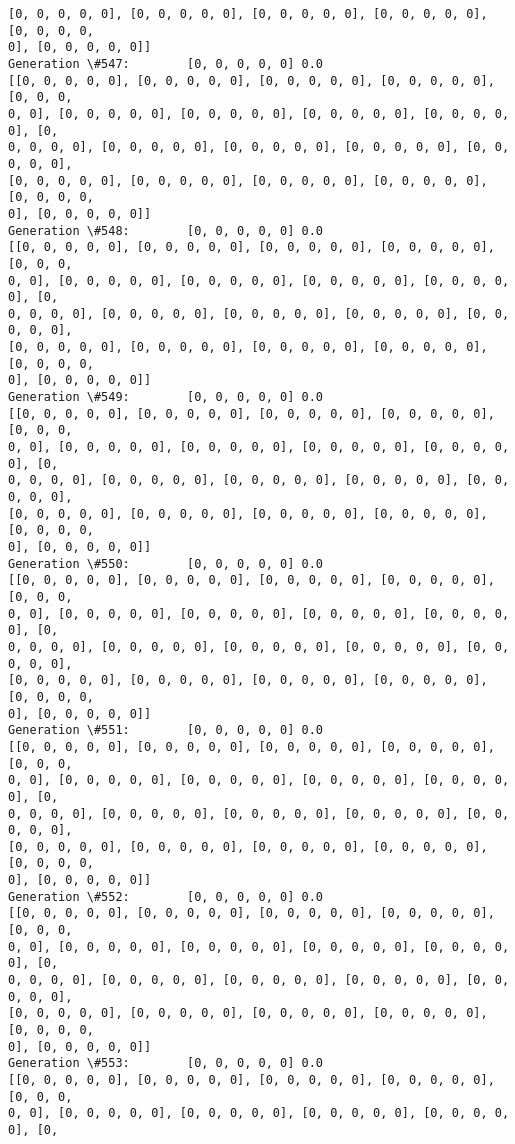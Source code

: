 \documentclass[11pt]{article}
\begin{document}
\begin{Verbatim}[commandchars=\\\{\}]
[0, 0, 0, 0, 0], [0, 0, 0, 0, 0], [0, 0, 0, 0, 0], [0, 0, 0, 0, 0], [0, 0, 0, 0,
0], [0, 0, 0, 0, 0]]
Generation \#547:        [0, 0, 0, 0, 0] 0.0
[[0, 0, 0, 0, 0], [0, 0, 0, 0, 0], [0, 0, 0, 0, 0], [0, 0, 0, 0, 0], [0, 0, 0,
0, 0], [0, 0, 0, 0, 0], [0, 0, 0, 0, 0], [0, 0, 0, 0, 0], [0, 0, 0, 0, 0], [0,
0, 0, 0, 0], [0, 0, 0, 0, 0], [0, 0, 0, 0, 0], [0, 0, 0, 0, 0], [0, 0, 0, 0, 0],
[0, 0, 0, 0, 0], [0, 0, 0, 0, 0], [0, 0, 0, 0, 0], [0, 0, 0, 0, 0], [0, 0, 0, 0,
0], [0, 0, 0, 0, 0]]
Generation \#548:        [0, 0, 0, 0, 0] 0.0
[[0, 0, 0, 0, 0], [0, 0, 0, 0, 0], [0, 0, 0, 0, 0], [0, 0, 0, 0, 0], [0, 0, 0,
0, 0], [0, 0, 0, 0, 0], [0, 0, 0, 0, 0], [0, 0, 0, 0, 0], [0, 0, 0, 0, 0], [0,
0, 0, 0, 0], [0, 0, 0, 0, 0], [0, 0, 0, 0, 0], [0, 0, 0, 0, 0], [0, 0, 0, 0, 0],
[0, 0, 0, 0, 0], [0, 0, 0, 0, 0], [0, 0, 0, 0, 0], [0, 0, 0, 0, 0], [0, 0, 0, 0,
0], [0, 0, 0, 0, 0]]
Generation \#549:        [0, 0, 0, 0, 0] 0.0
[[0, 0, 0, 0, 0], [0, 0, 0, 0, 0], [0, 0, 0, 0, 0], [0, 0, 0, 0, 0], [0, 0, 0,
0, 0], [0, 0, 0, 0, 0], [0, 0, 0, 0, 0], [0, 0, 0, 0, 0], [0, 0, 0, 0, 0], [0,
0, 0, 0, 0], [0, 0, 0, 0, 0], [0, 0, 0, 0, 0], [0, 0, 0, 0, 0], [0, 0, 0, 0, 0],
[0, 0, 0, 0, 0], [0, 0, 0, 0, 0], [0, 0, 0, 0, 0], [0, 0, 0, 0, 0], [0, 0, 0, 0,
0], [0, 0, 0, 0, 0]]
Generation \#550:        [0, 0, 0, 0, 0] 0.0
[[0, 0, 0, 0, 0], [0, 0, 0, 0, 0], [0, 0, 0, 0, 0], [0, 0, 0, 0, 0], [0, 0, 0,
0, 0], [0, 0, 0, 0, 0], [0, 0, 0, 0, 0], [0, 0, 0, 0, 0], [0, 0, 0, 0, 0], [0,
0, 0, 0, 0], [0, 0, 0, 0, 0], [0, 0, 0, 0, 0], [0, 0, 0, 0, 0], [0, 0, 0, 0, 0],
[0, 0, 0, 0, 0], [0, 0, 0, 0, 0], [0, 0, 0, 0, 0], [0, 0, 0, 0, 0], [0, 0, 0, 0,
0], [0, 0, 0, 0, 0]]
Generation \#551:        [0, 0, 0, 0, 0] 0.0
[[0, 0, 0, 0, 0], [0, 0, 0, 0, 0], [0, 0, 0, 0, 0], [0, 0, 0, 0, 0], [0, 0, 0,
0, 0], [0, 0, 0, 0, 0], [0, 0, 0, 0, 0], [0, 0, 0, 0, 0], [0, 0, 0, 0, 0], [0,
0, 0, 0, 0], [0, 0, 0, 0, 0], [0, 0, 0, 0, 0], [0, 0, 0, 0, 0], [0, 0, 0, 0, 0],
[0, 0, 0, 0, 0], [0, 0, 0, 0, 0], [0, 0, 0, 0, 0], [0, 0, 0, 0, 0], [0, 0, 0, 0,
0], [0, 0, 0, 0, 0]]
Generation \#552:        [0, 0, 0, 0, 0] 0.0
[[0, 0, 0, 0, 0], [0, 0, 0, 0, 0], [0, 0, 0, 0, 0], [0, 0, 0, 0, 0], [0, 0, 0,
0, 0], [0, 0, 0, 0, 0], [0, 0, 0, 0, 0], [0, 0, 0, 0, 0], [0, 0, 0, 0, 0], [0,
0, 0, 0, 0], [0, 0, 0, 0, 0], [0, 0, 0, 0, 0], [0, 0, 0, 0, 0], [0, 0, 0, 0, 0],
[0, 0, 0, 0, 0], [0, 0, 0, 0, 0], [0, 0, 0, 0, 0], [0, 0, 0, 0, 0], [0, 0, 0, 0,
0], [0, 0, 0, 0, 0]]
Generation \#553:        [0, 0, 0, 0, 0] 0.0
[[0, 0, 0, 0, 0], [0, 0, 0, 0, 0], [0, 0, 0, 0, 0], [0, 0, 0, 0, 0], [0, 0, 0,
0, 0], [0, 0, 0, 0, 0], [0, 0, 0, 0, 0], [0, 0, 0, 0, 0], [0, 0, 0, 0, 0], [0,

\end{Verbatim}
\end{document}
